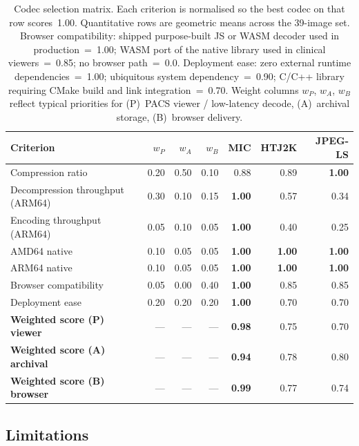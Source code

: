 \documentclass[journal]{IEEEtran}
\begin{document}
\begin{table}[htbp]
\centering
\caption{Codec selection matrix. Each criterion is normalised so the
best codec on that row scores~1.00. Quantitative rows are geometric
means across the 39-image set. Browser compatibility: shipped
purpose-built JS or WASM decoder used in production~=~1.00; WASM port of
the native library used in clinical viewers~=~0.85; no browser
path~=~0.0. Deployment ease: zero external runtime dependencies~=~1.00;
ubiquitous system dependency~=~0.90; C/C++ library requiring CMake build
and link integration~=~0.70. Weight columns $w_P$, $w_A$, $w_B$ reflect
typical priorities for (P)~PACS viewer / low-latency decode, (A)~archival
storage, (B)~browser delivery.}
\label{tab:decision-matrix}
\scriptsize
\setlength{\tabcolsep}{3pt}
\begin{tabular}{lrrrrrr}
\toprule
Criterion & $w_P$ & $w_A$ & $w_B$ & MIC & HTJ2K & JPEG-LS \\
\midrule
Compression ratio                & 0.20 & 0.50 & 0.10 & 0.88 & 0.89 & \textbf{1.00} \\
Decompression throughput (ARM64) & 0.30 & 0.10 & 0.15 & \textbf{1.00} & 0.57 & 0.34 \\
Encoding throughput (ARM64)      & 0.05 & 0.10 & 0.05 & \textbf{1.00} & 0.40 & 0.25 \\
AMD64 native                     & 0.10 & 0.05 & 0.05 & \textbf{1.00} & \textbf{1.00} & \textbf{1.00} \\
ARM64 native                     & 0.10 & 0.05 & 0.05 & \textbf{1.00} & \textbf{1.00} & \textbf{1.00} \\
Browser compatibility            & 0.05 & 0.00 & 0.40 & \textbf{1.00} & 0.85 & 0.85 \\
Deployment ease                  & 0.20 & 0.20 & 0.20 & \textbf{1.00} & 0.70 & 0.70 \\
\midrule
\textbf{Weighted score (P) viewer}   & --- & --- & --- & \textbf{0.98} & 0.75 & 0.70 \\
\textbf{Weighted score (A) archival} & --- & --- & --- & \textbf{0.94} & 0.78 & 0.80 \\
\textbf{Weighted score (B) browser}  & --- & --- & --- & \textbf{0.99} & 0.77 & 0.74 \\
\bottomrule
\end{tabular}
\end{table}

\subsection{Limitations}
\end{document}

